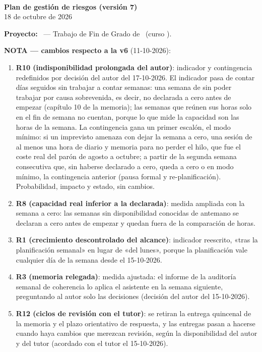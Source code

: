 \documentclass[11pt,a4paper]{article}
\begin{document}
\begin{center}
  {\Huge\bfseries\bukit}\\[0.5cm]
  {\Large\bfseries Plan de gestión de riesgos (versión 7)}\\[0.4cm]
  {\large 18 de octubre de 2026}
\end{center}
\vspace{0.6cm}

\textbf{Proyecto:} \thesisTitle\ — Trabajo de Fin de Grado de \thesisAuthor\ (curso \thesisCourse).

\textbf{NOTA — cambios respecto a la v6} (11-10-2026):
\begin{enumerate}
  \item \textbf{R10 (indisponibilidad prolongada del autor)}: indicador y contingencia redefinidos por decisión del autor del 17-10-2026.
  El indicador pasa de contar días seguidos sin trabajar a contar semanas: una semana de  sin poder trabajar por causa sobrevenida, es decir, no declarada a cero antes de empezar (capítulo 10 de la memoria); las semanas que reúnen sus horas solo en el fin de semana no cuentan, porque lo que mide la capacidad son las horas de la semana.
  La contingencia gana un primer escalón, el modo mínimo: si un imprevisto amenaza con dejar la semana a cero, una sesión de al menos una hora de diario y memoria para no perder el hilo, que fue el coste real del parón de agosto a octubre; a partir de la segunda semana consecutiva que, sin haberse declarado a cero, queda a cero o en modo mínimo, la contingencia anterior (pausa formal y re-planificación).
  Probabilidad, impacto y estado, sin cambios.
  \item \textbf{R8 (capacidad real inferior a la declarada)}: medida ampliada con la semana a cero: las semanas sin disponibilidad conocidas de antemano se declaran a cero antes de empezar y quedan fuera de la comparación de horas.
  \item \textbf{R1 (crecimiento descontrolado del alcance)}: indicador reescrito, «tras la planificación semanal» en lugar de «del lunes», porque la planificación vale cualquier día de la semana desde el 15-10-2026.
  \item \textbf{R3 (memoria relegada)}: medida ajustada: el informe de la auditoría semanal de coherencia lo aplica el asistente en la semana siguiente, preguntando al autor solo las decisiones (decisión del autor del 15-10-2026).
  \item \textbf{R12 (ciclos de revisión con el tutor)}: se retiran la entrega quincenal de la memoria y el plazo orientativo de respuesta, y las entregas pasan a hacerse cuando haya cambios que merezcan revisión, según la disponibilidad del autor y del tutor (acordado con el tutor el 15-10-2026).

\end{enumerate}
\end{document}
